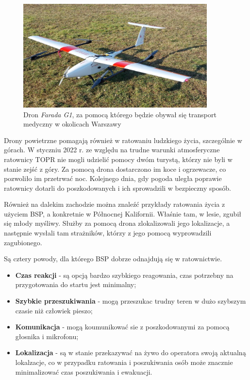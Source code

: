 \begin{figure}[!h]
\begin{center}
  \includegraphics[width=10cm]{./Obrazy/Farada_G1.jpg}
  \caption{Dron \textit{Farada G1}, za pomocą którego będzie obywał się transport medyczny w okolicach Warszawy}
\end{center}
\end{figure}

Drony powietrzne pomagają również w ratowaniu ludzkiego życia, szczególnie w górach. W styczniu 2022 r. ze względu na trudne warunki atmosferyczne ratownicy TOPR nie mogli udzielić pomocy dwóm turystą, którzy nie byli w stanie zejść z góry. Za pomocą drona dostarczono im koce i ogrzewacze, co pozwoliło im przetrwać noc. Kolejnego dnia, gdy pogoda uległa poprawie ratownicy dotarli do poszkodowanych i ich sprowadzili w bezpieczny sposób.\cite{topr-dron}

Również na dalekim zachodzie można znaleźć przykłady ratowania życia z użyciem BSP, a konkretnie w Północnej Kalifornii. Właśnie tam, w lesie, zgubił się młody myśliwy. Służby za pomocą drona zlokalizowali jego lokalizacje, a następnie wysłali tam strażników, którzy z jego pomocą wyprowadzili zagubionego.\cite{bbc-drone-rescue} 

Są cztery powody, dla którego BSP dobrze odnajdują się w ratownictwie.
\begin{itemize}
  \item \textbf{Czas reakcji} - są opcją bardzo szybkiego reagowania, czas potrzebny na przygotowania do startu jest minimalny;
  \item \textbf{Szybkie przeszukiwania} - mogą przeszukac trudny teren w dużo szybszym czasie niż człowiek pieszo;
  \item \textbf{Komunikacja} - mogą koumunikować sie z poszkodowanymi za pomocą głosnika i mikrofonu;
  \item \textbf{Lokalizacja} - są w stanie przekazywać na żywo do operatora swoją aktualną lokalzacje, co w przypadku ratowania i poszukiwania osób może znacznie minimalizować czas poszukiwania i ewakuacji. \cite{snowbrains-drone}
\end{itemize}

